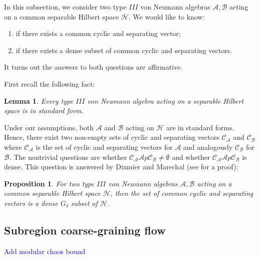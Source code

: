 \documentclass[a4paper,11pt]{article}
\newtheorem{lemma}[theorem]{Lemma}
\newtheorem{proposition}[theorem]{Proposition}
\theoremstyle{definition}
\newcommand{\NL}[1]{\textcolor{blue}{#1}}
\begin{document}
In this subsection, we consider two type $III$ von Neumann algebras $\mathcal{A},\mathcal{B}$ acting on a common separable Hilbert space $\mathcal{H}$. We would like to know:
\begin{enumerate}
    \item if there exists a common cyclic and separating vector;
    \item if there exists a dense subset of common cyclic and separating vectors.
\end{enumerate}
It turns out the answers to both questions are affirmative.

First recall the following fact\cite{blackadar}:
\begin{lemma}\label{lemma:blackadar}
    Every type $III$ von Neumann algebra acting on a separable Hilbert space is in standard form.
\end{lemma}
Under our assumptions, both $\mathcal{A}$ and $\mathcal{B}$ acting on $\mathcal{H}$ are in standard forms. Hence, there exist two non-empty sets of cyclic and separating vectors $\mathcal{C}_\mathcal{A}$ and $\mathcal{C}_\mathcal{B}$ where $\mathcal{C}_\mathcal{A}$ is the set of cyclic and separating vectors for $\mathcal{A}$ and analogously $\mathcal{C}_\mathcal{B}$ for $\mathcal{B}$. The nontrivial questions are whether $\mathcal{C}_\mathcal{A}\mathcal{A}p\mathcal{C}_\mathcal{B} \neq\emptyset$ and whether $\mathcal{C}_\mathcal{A}\mathcal{A}p\mathcal{C}_\mathcal{B}$ is dense. This question is answered by Dixmier and Marechal (see \cite{dixmiermarechal} for a proof):
\begin{proposition}\label{prop:density}
    For two type $III$ von Neumann algebras $\mathcal{A}, \mathcal{B}$ acting on a common separable Hilbert space $\mathcal{H}$, then the set of common cyclic and separating vectors is a dense $G_\delta$ subset of $\mathcal{H}$.
\end{proposition}



\subsection*{Subregion coarse-graining flow}

\NL{Add modular chaos bound}
\end{document}
